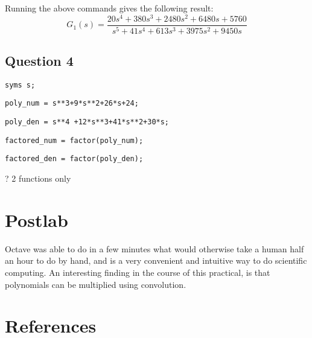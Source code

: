 \documentclass[12pt, a4paper]{article}
\begin{document}
			\noindent Running the above commands gives the following result:
			\[
				G_1(s) = \frac{20 s^4 + 380 s^3 + 2480 s^2 + 6480 s + 5760}{s^5 + 41 s^4 + 613 s^3 + 3975 s^2 + 9450 s}
			\]


		\subsection*{Question 4} %
		\label{sub:question_4}
		\texttt{syms s;}\par\noindent
		\texttt{poly\_num = s**3+9*s**2+26*s+24;}\par\noindent
		\texttt{poly\_den = s**4 +12*s**3+41*s**2+30*s;}\par\noindent
		\texttt{factored\_num = factor(poly\_num);}\par\noindent
		\texttt{factored\_den = factor(poly\_den);}\par\noindent
		? 2 functions only 



	\section{Postlab} %
	\label{sec:postlab}
		Octave was able to do in a few minutes what would otherwise take a human half an hour to do by hand, and is a very convenient and intuitive way to do scientific computing. An interesting finding in the course of this practical, is that polynomials can be multiplied using convolution.

	\section{References} %
	\label{sec:references}
		
\end{document}
